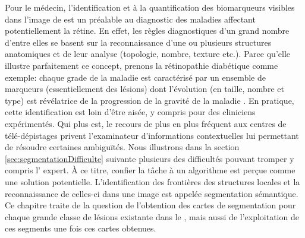 \label{sec:Theme1}
\label{sec:ChapitreSegmentation}


Pour le médecin, l'identification et à la quantification des biomarqueurs visibles dans l'image de \fundus{} est un préalable au diagnostic des maladies affectant potentiellement la rétine. En effet, les règles diagnostiques d'un grand nombre d'entre elles se basent sur la reconnaissance d'une ou plusieurs structures anatomiques et de leur analyse (topologie, nombre, texture etc.). Parce qu'elle illustre parfaitement ce concept, prenons la rétinopathie diabétique comme exemple: chaque grade de la maladie est caractérisé par un ensemble de marqueurs (essentiellement des lésions) dont l'évolution (en taille, nombre et type) est révélatrice de la progression de la gravité de la maladie \cite{boucherEvidencebasedCanadianGuidelines2020}. En pratique, cette identification est loin d'être aisée, y compris pour des cliniciens expérimentés. Qui plus est, le recours de plus en plus fréquent aux centres de télé-dépistages privent l'examinateur d'informations contextuelles lui permettant de résoudre certaines ambiguïtés. Nous illustrons dans la section \ref{sec:segmentationDifficulte} suivante  plusieurs des difficultés pouvant tromper y compris l'\oeil{} expert. À ce titre, confier la tâche à un algorithme est perçue comme une solution potentielle. L'identification des frontières des structures locales et la reconnaissance de celles-ci dans une image est appelée segmentation sémantique. Ce chapitre traite de la question de l'obtention des cartes de segmentation pour chaque grande classe de lésions existante dans le \fundus{}, mais aussi de l'exploitation de ces segments une fois ces cartes obtenues.


